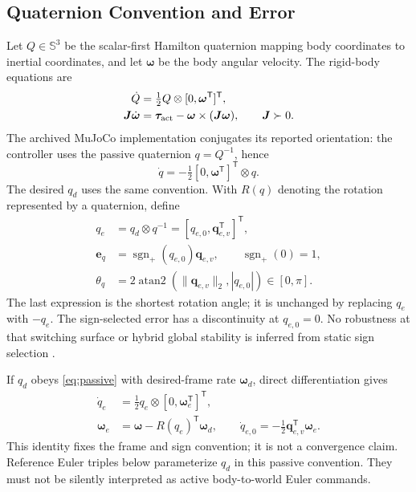 \documentclass[letterpaper,10pt,conference]{IEEEtran}
\newcommand{\T}{^{\mathsf T}}
\newcommand{\sgnp}{\operatorname{sgn}_{+}}
\begin{document}
\subsection{Quaternion Convention and Error}
Let $Q\in\mathbb S^3$ be the scalar-first Hamilton quaternion mapping body
coordinates to inertial coordinates, and let $\bm\omega$ be the body angular
velocity. The rigid-body equations are
\begin{align}
 \dot Q&=\tfrac12 Q\otimes[0,\bm\omega\T]\T,\\
 \bm J\dot{\bm\omega}&=\bm\tau_{\rm act}
       -\bm\omega\times(\bm J\bm\omega),\qquad \bm J\succ0.
 \label{eq:plant}
\end{align}
The archived MuJoCo implementation conjugates its reported orientation:
the controller uses the passive quaternion $q=Q^{-1}$, hence
\begin{equation}
 \dot q=-\tfrac12[0,\bm\omega\T]\T\otimes q.
 \label{eq:passive}
\end{equation}
The desired $q_d$ uses the same convention. With $R(q)$ denoting the
rotation represented by a quaternion, define
\begin{align}
 q_e&=q_d\otimes q^{-1}=[q_{e,0},\bm q_{e,v}\T]\T,\\
 \bm e_q&=\sgnp(q_{e,0})\bm q_{e,v},\qquad \sgnp(0)=1,\\
 \theta_q&=2\operatorname{atan2}(\|\bm q_{e,v}\|_2,|q_{e,0}|)
             \in[0,\pi].
 \label{eq:theta}
\end{align}
The last expression is the shortest rotation angle; it is unchanged by
replacing $q_e$ with $-q_e$. The sign-selected error has a discontinuity at
$q_{e,0}=0$. No robustness at that switching surface or hybrid global
stability is inferred from static sign selection \cite{mayhew2011hybrid}.

If $q_d$ obeys \eqref{eq:passive} with desired-frame rate
$\bm\omega_d$, direct differentiation gives
\begin{align}
 \dot q_e&=\tfrac12 q_e\otimes[0,\bm\omega_e\T]\T,\\
 \bm\omega_e&=\bm\omega-R(q_e)\T\bm\omega_d,\qquad
 \dot q_{e,0}=-\tfrac12\bm q_{e,v}\T\bm\omega_e.
 \label{eq:errkin}
\end{align}
This identity fixes the frame and sign convention; it is not a convergence
claim. Reference Euler triples below parameterize $q_d$ in this passive
convention. They must not be silently interpreted as active body-to-world
Euler commands.
\end{document}
